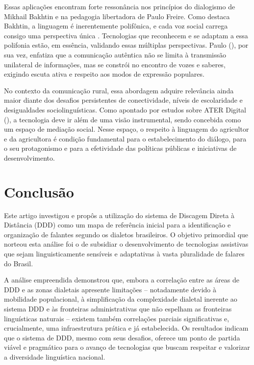 Essas aplicações encontram forte ressonância nos princípios do dialogismo de Mikhail Bakhtin e na pedagogia libertadora de Paulo Freire. Como destaca Bakhtin, a linguagem é inerentemente polifônica, e cada voz social carrega consigo uma perspectiva única \cite{bakhtin1997estetica}. Tecnologias que reconhecem e se adaptam a essa polifonia estão, em essência, validando essas múltiplas perspectivas. Paulo (\citeyear{freire2005pedagogia}), por sua vez, enfatiza que a comunicação autêntica não se limita à transmissão unilateral de informações, mas se constrói no encontro de vozes e saberes, exigindo escuta ativa e respeito aos modos de expressão populares.

No contexto da comunicação rural, essa abordagem adquire relevância ainda maior diante dos desafios persistentes de conectividade, níveis de escolaridade e desigualdades sociolinguísticas. Como apontado por estudos sobre ATER Digital (\cite{parra2022ater}), a tecnologia deve ir além de uma visão instrumental, sendo concebida como um espaço de mediação social. Nesse espaço, o respeito à linguagem do agricultor e da agricultora é condição fundamental para o estabelecimento do diálogo, para o seu protagonismo e para a efetividade das políticas públicas e iniciativas de desenvolvimento.


\section{Conclusão}


Este artigo investigou e propôs a utilização do sistema de Discagem Direta à Distância (DDD) como um mapa de referência inicial para a identificação e organização de falantes segundo os dialetos brasileiros. O objetivo primordial que norteou esta análise foi o de subsidiar o desenvolvimento de tecnologias assistivas que sejam linguisticamente sensíveis e adaptativas à vasta pluralidade de falares do Brasil.

A análise empreendida demonstrou que, embora a correlação entre as áreas de DDD e as zonas dialetais apresente limitações – notadamente devido à mobilidade populacional, à simplificação da complexidade dialetal inerente ao sistema DDD e às fronteiras administrativas que não espelham as fronteiras linguísticas naturais – existem também correlações parciais significativas e, crucialmente, uma infraestrutura prática e já estabelecida. Os resultados indicam que o sistema de DDD, mesmo com seus desafios, oferece um ponto de partida viável e pragmático para o avanço de tecnologias que buscam respeitar e valorizar a diversidade linguística nacional.

